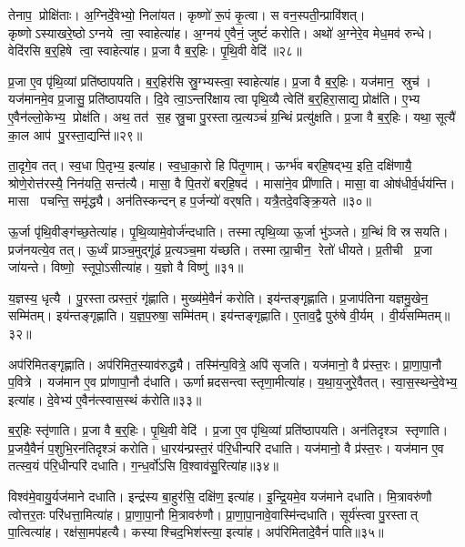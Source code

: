 तेनाप॒ प्रोक्षि॑ताः।
अ॒ग्निर्दे॒वेभ्यो॒ निला॑यत।
कृष्णो॑ रू॒पं कृ॒त्वा।
स वन॒स्पती॒न्प्रावि॑शत्।
कृष्णोऽस्याखरे॒ष्ठोऽग्नये त्वा॒ स्वाहेत्या॑ह।
अ॒ग्नय॑ ए॒वैनं॒ जुष्टं॑ करोति।
अथो॑ अ॒ग्नेरे॒व मेध॒मव॑ रुन्धे।
वेदि॑रसि ब॒र्॒हिषे त्वा॒ स्वाहेत्या॑ह।
प्र॒जा वै ब॒र्॒हिः।
पृ॒थि॒वी वेदि॑॥२८॥

प्र॒जा ए॒व पृ॑थि॒व्यां प्रति॑ष्ठापयति।
ब॒र्॒हिर॑सि स्रु॒ग्भ्यस्त्वा॒ स्वाहेत्या॑ह।
प्र॒जा वै ब॒र्॒हिः।
यज॑मान॒ स्रुच॑।
यज॑मानमे॒व प्र॒जासु॒ प्रति॑ष्ठापयति।
दि॒वे त्वा॒ऽन्तरि॑क्षाय त्वा पृथि॒व्यै त्वेति॑ ब॒र्॒हिरा॒साद्य॒ प्रोक्ष॑ति।
ए॒भ्य ए॒वैन॑ल्लो॒केभ्य॒ प्रोक्ष॑ति।
अथ॒ तत॑ स॒ह स्रु॒चा पु॒रस्तात्प्र॒त्यञ्चं॑ ग्र॒न्थिं प्रत्यु॑क्षति।
प्र॒जा वै ब॒र्॒हिः।
यथा॒ सूत्यै॑ का॒ल आप॑ पु॒रस्ता॒द्यन्ति॑॥२९॥

ता॒दृगे॒व तत्।
स्व॒धा पि॒तृभ्य॒ इत्या॑ह।
स्व॒धा॒का॒रो हि पि॑तृ॒णाम्।
ऊर्ग्भ॑व बर्‌हि॒षद्भ्य॒ इति॒ दक्षि॑णायै॒ श्रोणे॒रोत्त॑रस्यै॒ निन॑यति॒ सन्त॑त्यै।
मासा॒ वै पि॒तरो॑ बर्‌हि॒षद॑।
मासा॑ने॒व प्री॑णाति।
मासा॒ वा ओष॑धीर्व॒र्धय॑न्ति।
मासा पचन्ति॒ समृ॑द्ध्यै।
अन॑तिस्कन्दन् ह प॒र्जन्यो॑ वर्‌षति।
यत्रै॒तदे॒वङ्क्रि॒यते॥३०॥

ऊ॒र्जा पृ॑थि॒वीङ्ग॑च्छ॒तेत्या॑ह।
पृ॒थि॒व्यामे॒वोर्ज॑न्दधाति।
तस्मात्पृथि॒व्या ऊ॒र्जा भु॑ञ्जते।
ग्र॒न्थिं वि स्रसयति।
प्रज॑नयत्ये॒व तत्।
ऊ॒र्ध्वं प्राञ्च॒मुद्गू॑ढं प्र॒त्यञ्च॒मा य॑च्छति।
तस्मात्प्रा॒चीन॒ रेतो॑ धीयते।
प्र॒तीची प्र॒जा जा॑यन्ते।
विष्णो॒ स्तूपो॒ऽसीत्या॑ह।
य॒ज्ञो वै विष्णु॑॥३१॥

य॒ज्ञस्य॒ धृत्यै।
पु॒रस्तात्प्रस्त॒रं गृ॑ह्णाति।
मुख्य॑मे॒वैनं॑ करोति।
इय॑न्तङ्गृह्णाति।
प्र॒जाप॑तिना यज्ञमु॒खेन॒ सम्मि॑तम्।
इय॑न्तङ्गृह्णाति।
य॒ज्ञ॒प॒रुषा॒ सम्मि॑तम्।
इय॑न्तङ्गृह्णाति।
ए॒ताव॒द्वै पुरु॑षे वी॒र्यम्।
वी॒र्य॑सम्मितम्॥३२॥

अप॑रिमितङ्गृह्णाति।
अप॑रिमित॒स्याव॑रुद्ध्यै।
तस्मि॑न्प॒वित्रे॒ अपि॑ सृजति।
यज॑मानो॒ वै प्र॑स्त॒रः।
प्रा॒णा॒पा॒नौ प॒वित्रे।
यज॑मान ए॒व प्रा॑णापा॒नौ द॑धाति।
ऊर्णाम्रदसन्त्वा स्तृणा॒मीत्या॑ह।
य॒था॒य॒जुरे॒वैतत्।
स्वा॒स॒स्थन्दे॒वेभ्य॒ इत्या॑ह।
दे॒वेभ्य॑ ए॒वैन॑त्स्वास॒स्थं क॑रोति॥३३॥

ब॒र्॒हिः स्तृ॑णाति।
प्र॒जा वै ब॒र्॒हिः।
पृ॒थि॒वी वेदि॑।
प्र॒जा ए॒व पृ॑थि॒व्यां प्रति॑ष्ठापयति।
अन॑तिदृश्ञ स्तृणाति।
प्र॒जयै॒वैनं॑ प॒शुभि॒रन॑तिदृश्ञं करोति।
धा॒रय॑न्प्रस्त॒रं प॑रि॒धीन्परि॑ दधाति।
यज॑मानो॒ वै प्र॑स्त॒रः।
यज॑मान ए॒व तत्स्व॒यं प॑रि॒धीन्परि॑ दधाति।
ग॒न्ध॒र्वो॑ऽसि वि॒श्वाव॑सु॒रित्या॑ह॥३४॥

विश्व॑मे॒वायु॒र्यज॑माने दधाति।
इन्द्र॑स्य बा॒हुर॑सि॒ दक्षि॑ण॒ इत्या॑ह।
इ॒न्द्रि॒यमे॒व यज॑माने दधाति।
मि॒त्रावरु॑णौ त्वोत्तर॒तः परि॑धत्ता॒मित्या॑ह।
प्रा॒णा॒पा॒नौ मि॒त्रावरु॑णौ।
प्रा॒णा॒पा॒नावे॒वास्मि॑न्दधाति।
सूर्य॑स्त्वा पु॒रस्तात् पा॒त्वित्या॑ह।
रक्ष॑सा॒मप॑हत्यै।
कस्याश्चिद॒भिश॑स्त्या॒ इत्या॑ह।
अप॑रिमितादे॒वैनं॑ पाति॥३५॥

